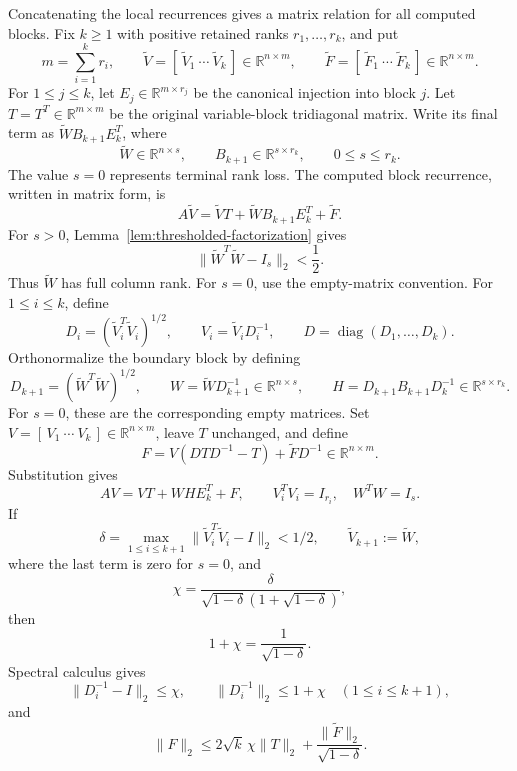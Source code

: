 \documentclass[11pt]{article}
\theoremstyle{definition}
\newcommand{\diag}{\operatorname{diag}}
\newcommand{\R}{\mathbb{R}}
\begin{document}
Concatenating the local recurrences gives a matrix relation for all computed
blocks.  Fix $k\ge1$ with positive retained ranks $r_1,\ldots,r_k$, and put
\[
 m=\sum_{i=1}^k r_i,\qquad
 \widetilde V=[\,\widetilde V_1\ \cdots\ \widetilde V_k\,]
    \in\R^{n\times m},\qquad
 \widetilde F=[\,\widetilde F_1\ \cdots\ \widetilde F_k\,]
    \in\R^{n\times m}.
\]
For $1\le j\le k$, let $E_j\in\R^{m\times r_j}$ be the canonical injection
into block $j$.  Let $T=T^T\in\R^{m\times m}$ be the original variable-block
tridiagonal matrix.  Write its final term as
$\widetilde W B_{k+1}E_k^T$, where
\[
 \widetilde W\in\R^{n\times s},\qquad
 B_{k+1}\in\R^{s\times r_k},\qquad 0\le s\le r_k.
\]
The value $s=0$ represents terminal rank loss.  The computed block recurrence,
written in matrix form, is
\[
 A\widetilde V=\widetilde VT+\widetilde W B_{k+1}E_k^T+\widetilde F.
\]
For $s>0$, Lemma~\ref{lem:thresholded-factorization} gives
\begin{equation}
 \|\widetilde W^T\widetilde W-I_s\|_2<\frac12.
 \label{eq:boundary-gram}
\end{equation}
Thus $\widetilde W$ has full column rank.  For $s=0$, use the empty-matrix
convention.
For $1\le i\le k$, define
\[
 D_i=(\widetilde V_i^T\widetilde V_i)^{1/2},\qquad
 V_i=\widetilde V_iD_i^{-1},\qquad
 D=\diag(D_1,\ldots,D_k).
\]
Orthonormalize the boundary block by defining
\[
 D_{k+1}=(\widetilde W^T\widetilde W)^{1/2},\qquad
 W=\widetilde W D_{k+1}^{-1}\in\R^{n\times s},\qquad
 H=D_{k+1}B_{k+1}D_k^{-1}\in\R^{s\times r_k}.
\]
For $s=0$, these are the corresponding empty matrices.  Set
$V=[\,V_1\ \cdots\ V_k\,]\in\R^{n\times m}$, leave $T$ unchanged, and define
\begin{equation}
 F=V(DTD^{-1}-T)+\widetilde FD^{-1}\in\R^{n\times m}.
 \label{eq:polar-transport}
\end{equation}
Substitution gives
\begin{equation}
 AV=VT+WHE_k^T+F,
 \qquad V_i^TV_i=I_{r_i},\quad W^TW=I_s.
 \label{eq:collected-block}
\end{equation}
If
\[
 \delta=\max_{1\le i\le k+1}
 \|\widetilde V_i^T\widetilde V_i-I\|_2<1/2,
 \qquad \widetilde V_{k+1}:=\widetilde W,
\]
where the last term is zero for $s=0$, and
\[
 \chi=\frac{\delta}
 {\sqrt{1-\delta}(1+\sqrt{1-\delta})},
\]
then
\[
 1+\chi=\frac{1}{\sqrt{1-\delta}}.
\]
Spectral calculus gives
\[
 \|D_i^{-1}-I\|_2\le\chi,
 \qquad \|D_i^{-1}\|_2\le1+\chi
 \quad(1\le i\le k+1),
\]
and
\begin{equation}
 \|F\|_2\le 2\sqrt{k}\,\chi\|T\|_2
       +\frac{\|\widetilde F\|_2}{\sqrt{1-\delta}}.
 \label{eq:normalized-F}
\end{equation}
\end{document}
